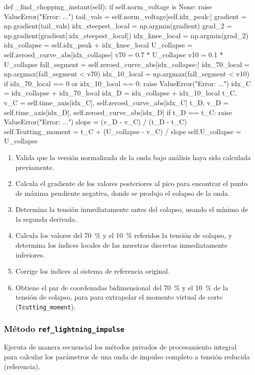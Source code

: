 \begin{python}
def _find_chopping_instant(self):
    if self.norm_voltage is None:
        raise ValueError("Error: ...")
    tail_vals = self.norm_voltage[self.idx_peak:]
    gradient = np.gradient(tail_vals)
    idx_steepest_local = np.argmin(gradient)
    grad_2 = np.gradient(gradient[:idx_steepest_local])
    idx_knee_local = np.argmin(grad_2)
    idx_collapse = self.idx_peak + idx_knee_local
    U_collapse = self.zeroed_curve_abs[idx_collapse]
    v70 = 0.7 * U_collapse
    v10 = 0.1 * U_collapse
    fall_segment = self.zeroed_curve_abs[idx_collapse:]
    idx_70_local = np.argmax(fall_segment < v70)
    idx_10_local = np.argmax(fall_segment < v10)
    if idx_70_local == 0 or idx_10_local == 0:
        raise ValueError("Error: ...")
    idx_C = idx_collapse + idx_70_local
    idx_D = idx_collapse + idx_10_local
    t_C, v_C = self.time_axis[idx_C], self.zeroed_curve_abs[idx_C]
    t_D, v_D = self.time_axis[idx_D], self.zeroed_curve_abs[idx_D]
    if t_D == t_C:
        raise ValueError("Error: ...")
    slope = (v_D - v_C) / (t_D - t_C)
    self.Tcutting_moment = t_C + (U_collapse - v_C) / slope
    self.U_collapse = U_collapse
\end{python}

\begin{enumerate}
    \item Valida que la versión normalizada de la onda bajo análisis haya sido calculada previamente.
    \item Calcula el gradiente de los valores posteriores al pico para encontrar el punto de máxima pendiente negativa, donde se produjo el colapso de la onda.
    \item Determina la tensión inmediatamente antes del colapso, usando el mínimo de la segunda derivada.
    \item Calcula los valores del \SI{70}{\percent} y el \SI{10}{\percent} referidos la tensión de colapso, y determina los índices locales de las muestras discretas inmediatamente inferiores.
    \item Corrige los índices al sistema de referencia original.
    \item Obtiene el par de coordenadas bidimensional del \SI{70}{\percent} y el \SI{10}{\percent} de la tensión de colapso, para para extrapolar el momento virtual de corte (\texttt{Tcutting\_moment}).
\end{enumerate}

\subsubsection{Método \texttt{ref\_lightning\_impulse}}
Ejecuta de manera secuencial los métodos privados de procesamiento integral para calcular los parámetros de una onda de impulso completo a tensión reducida (referencia).

